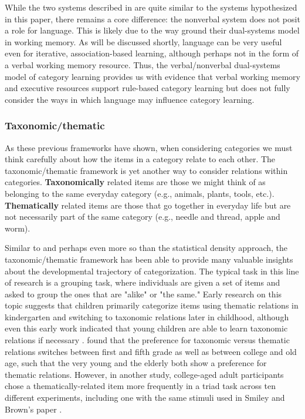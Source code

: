 \documentclass[../dissertation.tex]{subfiles}
\begin{document}
	While the two systems described in \citet{Minda2010} are quite similar to the systems hypothesized in this paper, there remains a core difference: the nonverbal system does not posit a role for language. This is likely due to the way \citet{Minda2010} ground their dual-systems model in working memory. As will be discussed shortly, language can be very useful even for iterative, association-based learning, although perhaps not in the form of a verbal working memory resource. Thus, the verbal/nonverbal dual-systems model of category learning provides us with evidence that verbal working memory and executive resources support rule-based category learning but does not fully consider the ways in which language may influence category learning. 
	
\subsubsection{Taxonomic/thematic}
	As these previous frameworks have shown, when considering categories we must think carefully about how the items in a category relate to each other. The taxonomic/thematic framework is yet another way to consider relations within categories. \textbf{Taxonomically} related items are those we might think of as belonging to the same everyday category (e.g., animals, plants, tools, etc.). \textbf{Thematically} related items are those that go together in everyday life but are not necessarily part of the same category (e.g., needle and thread, apple and worm).  \par
	Similar to and perhaps even more so than the statistical density approach, the taxonomic/thematic framework has been able to provide many valuable insights about the developmental trajectory of categorization. The typical task in this line of research is a grouping task, where individuals are given a set of items and asked to group the ones that are "alike" or "the same." Early research on this topic suggests that children primarily categorize items using thematic relations in kindergarten and switching to taxonomic relations later in childhood, although even this early work indicated that young children are able to learn taxonomic relations if necessary \citep{vygotsky1962language,piaget1964early}. \citet{Smiley1979} found that the preference for taxonomic versus thematic relations switches between first and fifth grade as well as between college and old age, such that the very young and the elderly both show a preference for thematic relations. However, in another study, college-aged adult participants chose a thematically-related item more frequently in a triad task across ten different experiments, including one with the same stimuli used in Smiley and Brown's paper \citep{Lin2001}. \par
\end{document}
